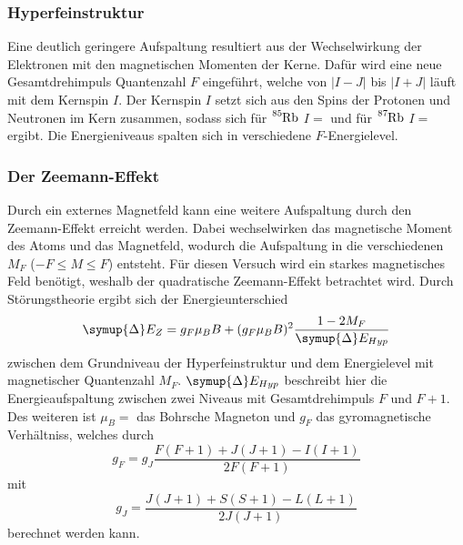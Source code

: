 \subsubsection{Hyperfeinstruktur}
Eine deutlich geringere Aufspaltung resultiert aus der Wechselwirkung der Elektronen mit den magnetischen Momenten der Kerne.
Dafür wird eine neue Gesamtdrehimpuls Quantenzahl $F$ eingeführt, welche von $|I - J|$ bis $|I + J|$ läuft mit dem Kernspin $I$.
Der Kernspin $I$ setzt sich aus den Spins der Protonen und Neutronen im Kern zusammen, sodass sich für $\ce{^{85}Rb}$ $I = $  und für $\ce{^{87}Rb}$
$I = $ ergibt. Die Energieniveaus spalten sich in verschiedene $F$-Energielevel. 

\subsubsection{Der Zeemann-Effekt}
Durch ein externes Magnetfeld kann eine weitere Aufspaltung durch den Zeemann-Effekt erreicht werden.
Dabei wechselwirken das magnetische Moment des Atoms und das Magnetfeld, wodurch die Aufspaltung in die
verschiedenen $M_F$ ($-F \leq M \leq F$) entsteht. Für diesen Versuch wird ein starkes magnetisches Feld benötigt,
weshalb der quadratische Zeemann-Effekt betrachtet wird.
Durch Störungstheorie ergibt sich der Energieunterschied
\begin{equation}
    \symup{\Delta} E_Z = g_F \mu_B B + (g_F \mu_B B)^2 \frac{1-2M_F}{\symup{\Delta} E_{Hyp}}
\end{equation}
zwischen dem Grundniveau der Hyperfeinstruktur und dem Energielevel mit magnetischer Quantenzahl $M_F$. 
$\symup{\Delta} E_{Hyp}$ beschreibt hier die Energieaufspaltung zwischen zwei Niveaus mit Gesamtdrehimpuls $F$ und $F+1$.
Des weiteren ist $\mu_B = $ das Bohrsche Magneton und $g_F$ das gyromagnetische Verhältniss, welches durch
\begin{equation}
    g_F = g_J \frac{F(F+1)+J(J+1)-I(I+1)}{2F(F+1)}
\end{equation}
mit
\begin{equation}
    g_J = \frac{J(J+1)+S(S+1)-L(L+1)}{2J(J+1)}
\end{equation}
berechnet werden kann.

